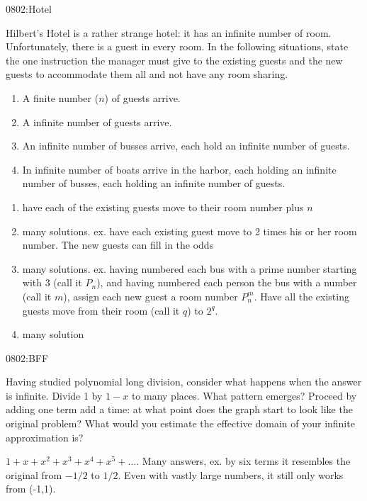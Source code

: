 \begin{defproblem}{0802:Hotel}
\begin{onlyproblem}
Hilbert's Hotel is a rather strange hotel: it has an infinite number of room.
Unfortunately, there is a guest in every room.
In the following situations, state the one instruction the manager must
give to the existing guests and the new guests to accommodate them all
and not have any room sharing.
\begin{enumerate}
\item A finite number ($n$) of guests arrive.
\item A infinite number of guests arrive.
\item An infinite number of busses arrive, each hold an infinite number of guests.
\item In infinite number of boats arrive in the harbor, each holding an infinite number of busses, each holding an infinite number of guests.
\end{enumerate}
\end{onlyproblem}

\begin{onlysolution}
\begin{enumerate}
\item have each of the existing guests move to their room number plus $n$
\item many solutions.  ex. have each existing guest move to 2 times his or her room number.  The new guests can fill in the odds
\item many solutions.  ex. having  numbered each bus with a prime number starting with 3 (call it $P_n$), and having numbered each person the bus with a number (call it $m$), assign each new guest a room number $P_n^m$.  Have all the existing guests move from their room (call it $q$) to $2^q$.
\item many solution
\end{enumerate}
\end{onlysolution}
\end{defproblem}


\begin{defproblem}{0802:BFF}
\begin{onlyproblem}
Having studied polynomial long division, consider what happens when the answer
is infinite.  Divide 1 by $1-x$ to many places.  What pattern emerges?  Proceed by
adding one term add a time: at what point does the graph start to look like the original
problem?  What would you estimate the effective domain of your infinite approximation
is?
\end{onlyproblem}
\begin{onlysolution}
$1+x+x^2+x^3+x^4+x^5+\dots$.  Many answers, ex. by six terms it resembles the original
from $-1/2$ to $1/2$.  Even with vastly large numbers, it still only works from (-1,1).
\end{onlysolution}
\end{defproblem}




